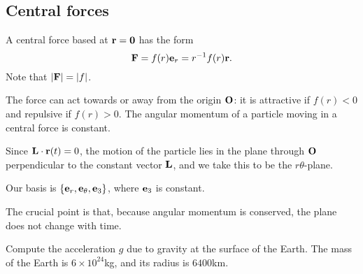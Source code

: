 \documentclass[10pt, a4paper]{article}
\begin{document}
\subsection{Central forces}
\begin{definition}
    A central force based at $\mathbf{r} = \mathbf{0}$ has the form
    \[
    \mathbf{F} = f(r)\mathbf{e}_r = r ^ {-1}f(r)\mathbf{r}.
    \]
    Note that $|\mathbf{F}| = |f|$.
\end{definition}

The force can act towards or away from the origin $\mathbf{O}$:
it is attractive if $f(r) < 0$ and repulsive if $f(r) > 0$.
The angular momentum of a particle moving in a central force is constant.

Since $\mathbf{L} \cdot \mathbf{r}(t) = 0$,
the motion of the particle lies in the plane through $\mathbf{O}$ perpendicular to the constant vector $\mathbf{L}$,
and we take this to be the $r\theta$-plane.

Our basis is $\{\mathbf{e}_r, \mathbf{e}_{\theta}, \mathbf{e}_3\}$,
where $\mathbf{e}_3$ is constant.

The crucial point is that,
because angular momentum is conserved,
the plane does not change with time.

\begin{example}
    Compute the acceleration $g$ due to gravity at the surface of the Earth.
    The mass of the Earth is $6 \times 10 ^ {24}$kg,
    and its radius is $6400$km.

    \begin{solution}
        
    \end{solution}
\end{example}
\end{document}
